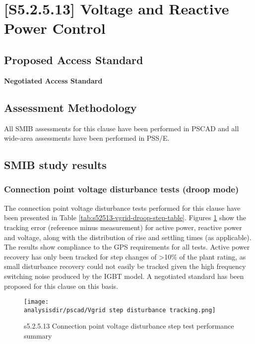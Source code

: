 \documentclass{../grid-link-report}
\newcommand{\projectassetsdir}{../project-assets}
\newcommand{\analysisdir}{report-assets/analysis}
\begin{document}
	\section{[S5.2.5.13] Voltage and Reactive Power Control}
	\subsection{Proposed Access Standard}
	\textbf{Negotiated Access Standard}
		\begin{tcolorbox}[lightgreenbox]
			
		\end{tcolorbox}
	\subsection{Assessment Methodology}
		
		
		
		All SMIB assessments for this clause have been performed in PSCAD and all wide-area assessments have been performed in PSS/E.
		
	\subsection{SMIB study results}
	
	\subsubsection{Connection point voltage disturbance tests (droop mode)}
	\label{subsec:s52513-vgrid-steps-droop-mode}
	
	The connection point voltage disturbance tests performed for this clause have been presented in Table \ref{tab:s52513-vgrid-droop-step-table}. Figures \ref{fig:s52513-vgrid-droop-step-summary-plot} show the tracking error (reference minus measurement) for active power, reactive power and voltage, along with the distribution of rise and settling times (as applicable). The results show compliance to the GPS requirements for all tests. Active power recovery has only been tracked for step changes of >10\% of the plant rating, as small disturbance recovery could not easily be tracked given the high frequency switching noise produced by the IGBT model. A negotiated standard has been proposed for this clause on this basis.
	
	
	\begin{figure}[H]
		\centering
		\texttt{[image: \\analysisdir/pscad/Vgrid step disturbance tracking.png]}
		\caption{s5.2.5.13 Connection point voltage disturbance step test performance summary}
		\label{fig:s52513-vgrid-droop-step-summary-plot}
	\end{figure}
	
\end{document}
